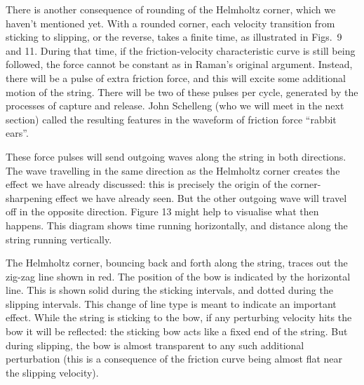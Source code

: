 
  There is another consequence of rounding of the Helmholtz corner, which we 
  haven’t mentioned yet. With a rounded corner, each velocity transition from 
  sticking to slipping, or the reverse, takes a finite time, as illustrated in 
  Figs.\ 9 and 11. During that time, if the friction-velocity characteristic 
  curve is still being followed, the force cannot be constant as in Raman's 
  original argument. Instead, there will be a pulse of extra friction force, 
  and this will excite some additional motion of the string. There will be two 
  of these pulses per cycle, generated by the processes of capture and release. 
  John Schelleng (who we will meet in the next section) called the resulting 
  features in the waveform of friction force “rabbit ears”. 

  These force pulses will send outgoing waves along the string in both 
  directions. The wave travelling in the same direction as the Helmholtz corner 
  creates the effect we have already discussed: this is precisely the origin of 
  the corner-sharpening effect we have already seen. But the other outgoing 
  wave will travel off in the opposite direction. Figure 13 might help to 
  visualise what then happens. This diagram shows time running horizontally, 
  and distance along the string running vertically. 


  The Helmholtz corner, bouncing back and forth along the string, traces out 
  the zig-zag line shown in red. The position of the bow is indicated by the 
  horizontal line. This is shown solid during the sticking intervals, and 
  dotted during the slipping intervals. This change of line type is meant to 
  indicate an important effect. While the string is sticking to the bow, if any 
  perturbing velocity hits the bow it will be reflected: the sticking bow acts 
  like a fixed end of the string. But during slipping, the bow is almost 
  transparent to any such additional perturbation (this is a consequence of the 
  friction curve being almost flat near the slipping velocity). 

